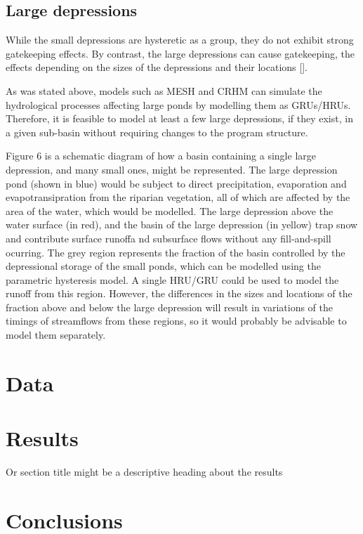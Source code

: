 \documentclass[draft,linenumbers]{agujournal2018}
\begin{document}
\subsection{Large depressions}

While the small depressions are hysteretic as a group, they do not
exhibit strong gatekeeping effects. By contrast, the large depressions
can cause gatekeeping, the effects depending on the sizes of the
depressions and their locations {[}{]}.

As was stated above, models such as MESH and CRHM can simulate the
hydrological processes affecting large ponds by modelling them as
GRUs/HRUs. Therefore, it is feasible to model at least a few large
depressions, if they exist, in a given sub-basin without requiring
changes to the program structure.

Figure 6 is a schematic diagram of how a basin containing a single large
depression, and many small ones, might be represented. The large
depression pond (shown in blue) would be subject to direct
precipitation, evaporation and evapotransipration from the riparian
vegetation, all of which are affected by the area of the water, which
would be modelled. The large depression above the water surface (in
red), and the basin of the large depression (in yellow) trap snow and
contribute surface runoffa nd subsurface flows without any
fill-and-spill ocurring. The grey region represents the fraction of the
basin controlled by the depressional storage of the small ponds, which
can be modelled using the parametric hysteresis model. A single HRU/GRU
could be used to model the runoff from this region. However, the
differences in the sizes and locations of the fraction above and below
the large depression will result in variations of the timings of
streamflows from these regions, so it would probably be advisable to
model them separately.

\section{Data}

\section{Results}

Or section title might be a descriptive heading about the results

\section{Conclusions}

\acknowledgments


\end{document}
